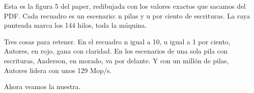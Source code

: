 Esta es la figura 5 del paper, redibujada con los valores exactos que sacamos del PDF. Cada recuadro es un escenario: n pilas y u por ciento de escrituras. La raya punteada marca los 144 hilos, toda la máquina.

Tres cosas para retener. En el recuadro n igual a 10, u igual a 1 por ciento, Autores, en rojo, gana con claridad. En los escenarios de una sola pila con escrituras, Anderson, en morado, va por delante. Y con un millón de pilas, Autores lidera con unos 129 Mop/s.

Ahora veamos la nuestra.
